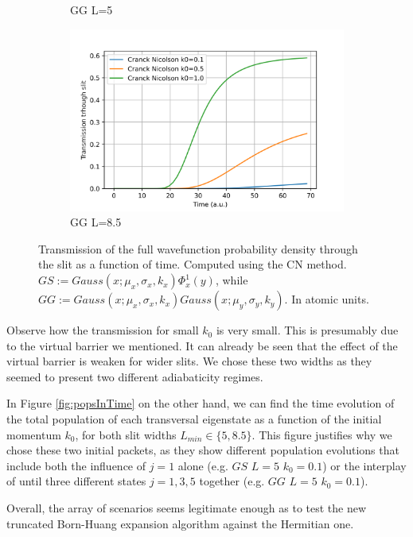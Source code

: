 \documentclass[11pt, a4paper]{article} %
\begin{document}
\begin{figure}[h!]
\begin{subfigure}[b]{0.49\linewidth}
    \caption{GG L=5}
  \end{subfigure}
    \begin{subfigure}[b]{0.5\linewidth}
    \includegraphics[width=\linewidth]{Transmission_GG_CN_L8.5.png}
    \caption{GG L=8.5}
  \end{subfigure}

  \caption{ Transmission of the full wavefunction probability density through the slit as a function of time. Computed using the CN method. $GS:=Gauss(x;\mu_x, \sigma_x, k_x)\Phi^1_x(y)$, while $GG:=Gauss(x;\mu_x, \sigma_x, k_x)Gauss(x;\mu_y, \sigma_y, k_y)$. In atomic units.}
  \label{fig:CNTransm}
\end{figure}

Observe how the transmission for small $k_0$ is very small. This is presumably due to the virtual barrier we mentioned. It can already be seen that the effect of the virtual barrier is weaken for wider slits. We chose these two widths as they seemed to present two different adiabaticity regimes.

In Figure \ref{fig:popsInTime} on the other hand, we can find the time evolution of the total population of each transversal eigenstate as a function of the initial momentum $k_0$, for both slit widths $L_{min}\in\{5, 8.5\}$. This figure justifies why we chose these two initial packets, as they show different population evolutions that include both the influence of $j=1$ alone (e.g. $GS$ $L=5$ $k_0=0.1$) or the interplay of until three different states $j=1,3,5$ together (e.g. $GG$ $L=5$ $k_0=0.1$).

Overall, the array of scenarios seems legitimate enough as to test the new truncated Born-Huang expansion algorithm against the Hermitian one.
\end{document}
